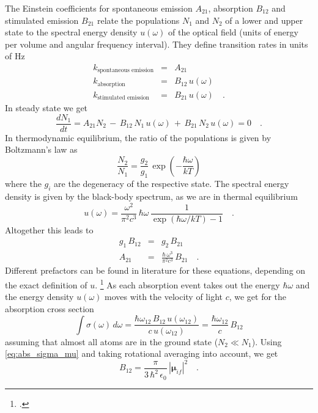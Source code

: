The Einstein coefficients for spontaneous emission $A_{21}$, absorption $B_{12}$ and stimulated emission $B_{21}$ relate the populations $N_1$ and $N_2$ of a lower and upper state to the spectral energy density $u(\omega)$ of the optical field (units of energy per volume and angular frequency interval). They define transition rates in units of Hz
\begin{eqnarray}
 k_{\text{spontaneous emission}} &=& A_{21} \\
  k_{\text{absorption}}  & = & B_{12} \,   u(\omega) \\
  k_{\text{stimulated emission }} & =&  B_{21} \,  u(\omega)  \quad .
\end{eqnarray}
%
In steady state we get
\begin{equation}
 \frac{d N_1}{dt} =  A_{21} N_2 \, - \, B_{12} \, N_1 \, u(\omega) \, + \, B_{21}\, N_2 \,u(\omega)  = 0 \quad .
\end{equation}
In thermodynamic equilibrium, the ratio of the populations is given by Boltzmann's law as
\begin{equation}
 \frac{N_2}{N_1} = \frac{g_2}{g_1} \, \exp \left( - \frac{\hbar \omega}{kT} \right)
\end{equation}
where the $g_i$ are the degeneracy of the respective state. The spectral energy density is given by the black-body spectrum, as we are in thermal equilibrium
\begin{equation}
 u(\omega) = \frac{\omega^2}{\pi^2 c^3} \, \hbar \omega \, \frac{1}{\exp \left( \hbar \omega / kT \right) - 1} \quad .
\end{equation}
Altogether this leads to 
\begin{eqnarray}
 g_1 \, B_{12} &=& g_2 \, B_{21} \\
 A_{21} &=&  \frac{\hbar \, \omega^3}{\pi^2 c^3} \, B_{21}  \quad . \label{eq:fl_Einstein_A_B}
\end{eqnarray}
Different prefactors can be found in literature for these equations, depending on the exact definition of $u$.
 \footcite{Hilborn:2002wj} 
 As each absorption event takes out the energy $\hbar \omega$ and the energy density $u(\omega)$ moves with the velocity of light $c$, we get for the absorption cross section
\begin{equation}
\int \sigma(\omega) \, d \omega = \frac{\hbar \omega_{12} \, B_{12} \, u(\omega_{12})  }{c \, u(\omega_{12}) }  =
   \frac{\hbar \omega_{12}  }{c  }    \, B_{12}
\end{equation}
assuming that almost all atoms are in the ground state ($N_2 \ll N_1$). Using \ref{eq:abs_sigma_mu} and taking rotational averaging into account, we get
\begin{equation}
B_{12} = \frac{\pi}{3 \, \hbar^2 \, \epsilon_0} \,  |\mathbf{\mu}_{if} |^2  \quad . \label{eq:fl_B_from_mu}
\end{equation}

